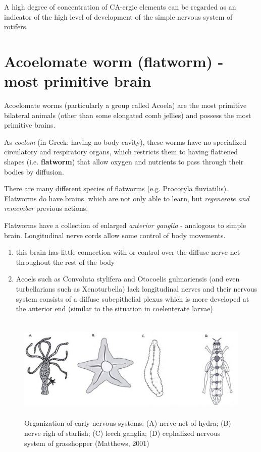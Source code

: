 A  high  degree  of concentration of CA-ergic elements can be regarded as an
indicator of the high level of development of the simple nervous system of
rotifers.



\section{Acoelomate worm (flatworm) - most primitive brain}
\label{sec:acoelomate-worm-brain}
\label{sec:flatworms}

Acoelomate worms (particularly a group called Acoela) are the most primitive
bilateral animals (other than some elongated comb jellies) and possess the most
primitive brains. 

As {\it coelom} (in Greek: having no body cavity), these worms have no
specialized circulatory and respiratory organs, which restricts them to having
flattened shapes (i.e. {\bf flatworm}) that allow oxygen and nutrients to pass
through their bodies by diffusion.

There are many different species of flatworms (e.g. Procotyla fluviatilis).
Flatworms do have brains, which are not only able to learn, but {\it regenerate
and remember} previous actions.

Flatworms have a collection of enlarged {\it anterior ganglia} - analogous to
simple brain. Longitudinal nerve cords allow some control of body movements.
\begin{enumerate}
  \item  this brain has little connection with or control over the diffuse nerve
  net throughout the rest of the body
  
  \item Acoels such as Convoluta stylifera and Otocoelis gulmariensis (and even
  turbellarians such as Xenoturbella) lack longitudinal nerves and their nervous
  system consists of a diffuse subepithelial plexus which is more developed at
  the anterior end (similar to the situation in coelenterate larvae)    
\end{enumerate}

\begin{figure}[hbt]
  \centerline{\includegraphics[height=5cm,
    angle=0]{./images/nervous-system.eps}}
\caption{Organization of early nervous systems: (A) nerve net of hydra; (B)
nerve righ of starfish; (C) leech ganglia; (D) cephalized nervous system of
grasshopper (Matthews, 2001)}
\label{fig:nervous-system}
\end{figure}


